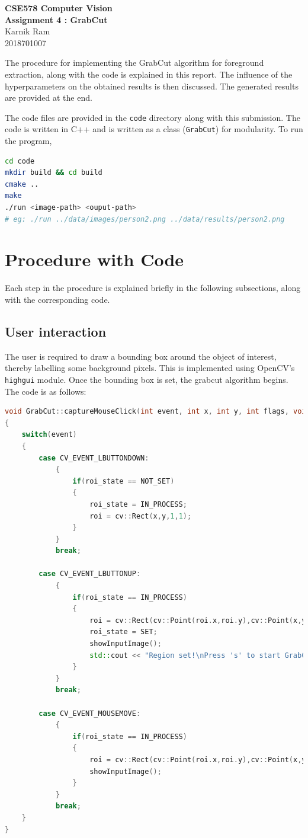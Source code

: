\documentclass[a4paper,11]{article}
\begin{document}
\begin{center}
  \large{\textbf{CSE578 Computer Vision}}\\
  \Large{\textbf{Assignment 4 : GrabCut}}\\
  \vspace{1em}
  \large{Karnik Ram\\
  2018701007}
\end{center}

The procedure for implementing the GrabCut algorithm for foreground extraction, along with the code is explained in this report. The influence of the hyperparameters on the obtained results is then discussed. The generated results are provided at the end.

The code files are provided in the \texttt{code} directory along with this submission. The code is written in C++ and is written as a class (\texttt{GrabCut}) for modularity. To run the program,

\begin{lstlisting}[language=bash]
cd code
mkdir build && cd build
cmake ..
make
./run <image-path> <ouput-path>
# eg: ./run ../data/images/person2.png ../data/results/person2.png
\end{lstlisting}

\section{Procedure with Code}
Each step in the procedure is explained briefly in the following subsections, along with the corresponding code.

  \subsection{User interaction}
  
  The user is required to draw a bounding box around the object of interest, thereby labelling some background pixels. This is implemented using OpenCV's \texttt{highgui} module. Once the bounding box is set, the grabcut algorithm begins. The code is as follows:
  \begin{lstlisting}[language=C++]
void GrabCut::captureMouseClick(int event, int x, int y, int flags, void *userdata)
{
	switch(event)
	{
		case CV_EVENT_LBUTTONDOWN:
			{
				if(roi_state == NOT_SET)
				{
					roi_state = IN_PROCESS;
					roi = cv::Rect(x,y,1,1);
				}
			}
			break;

		case CV_EVENT_LBUTTONUP:
			{
				if(roi_state == IN_PROCESS)
				{
					roi = cv::Rect(cv::Point(roi.x,roi.y),cv::Point(x,y));
					roi_state = SET;
					showInputImage();
					std::cout << "Region set!\nPress 's' to start GrabCut!\n";
				}
			}
			break;

		case CV_EVENT_MOUSEMOVE:
			{
				if(roi_state == IN_PROCESS)
				{
					roi = cv::Rect(cv::Point(roi.x,roi.y),cv::Point(x,y));
					showInputImage();
				}
			}
			break;
	}
}
  \end{lstlisting}
\end{document}
